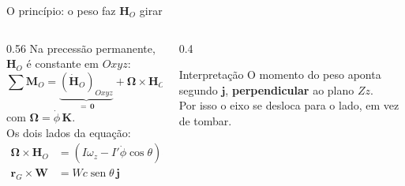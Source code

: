 \documentclass[11pt,aspectratio=169]{beamer}
\newcommand{\vet}[1]{\mathbf{#1}}
\newcommand{\vOmega}{\boldsymbol{\Omega}}
\newcommand{\seno}{\operatorname{sen}}
\newcommand{\phid}{\dot{\phi}}
\begin{document}
\begin{frame}{O princípio: o peso faz $\vet{H}_O$ girar}
  \begin{columns}[c]
    \begin{column}{0.56\textwidth}
      Na precessão permanente, $\vet{H}_O$ é constante em $Oxyz$:
      \[
        \sum\vet{M}_O=\underbrace{\left(\dot{\vet{H}}_O\right)_{Oxyz}}_{=\,\vet{0}}+\vOmega\times\vet{H}_O
        =\vOmega\times\vet{H}_O
      \]
      com $\vOmega=\phid\,\vet{K}$.\\[0.2cm]
      Os dois lados da equação:
      \begin{align*}
        \vOmega\times\vet{H}_O &= \left(I\omega_z-I'\phid\cos\theta\right)\phid\seno\theta\,\vet{j}\\
        \vet{r}_G\times\vet{W} &= Wc\seno\theta\,\vet{j}
      \end{align*}
    \end{column}
    \begin{column}{0.4\textwidth}
      \begin{block}{Interpretação}
        O momento do peso aponta segundo $\vet{j}$, \textbf{perpendicular} ao plano $Zz$.\\[0.15cm]
        Por isso o eixo se desloca para o lado, em vez de tombar.
      \end{block}
    \end{column}
  \end{columns}
\end{frame}
\end{document}

